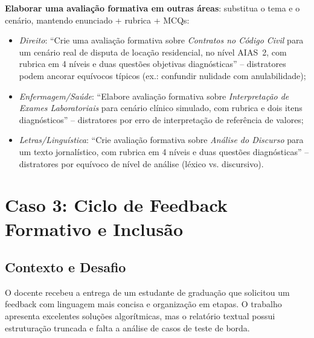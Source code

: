 \begin{adaptacaoarea}
\textbf{Elaborar uma avalia{\c c}{\~a}o formativa em outras {\'a}reas}: substitua o tema e o cen{\'a}rio, mantendo enunciado + rubrica + MCQs:
\begin{itemize}
  \item \emph{Direito}: ``Crie uma avalia{\c c}{\~a}o formativa sobre \emph{Contratos no C{\'o}digo Civil} para um cen{\'a}rio real de disputa de loca{\c c}{\~a}o residencial, no n{\'i}vel AIAS~2, com rubrica em 4 n{\'i}veis e duas quest{\~o}es objetivas diagn{\'o}sticas'' -- distratores podem ancorar equ{\'i}vocos t{\'i}picos (ex.: confundir nulidade com anulabilidade);
  \item \emph{Enfermagem/Sa{\'u}de}: ``Elabore avalia{\c c}{\~a}o formativa sobre \emph{Interpreta{\c c}{\~a}o de Exames Laboratoriais} para cen{\'a}rio cl{\'i}nico simulado, com rubrica e dois itens diagn{\'o}sticos'' -- distratores por erro de interpreta{\c c}{\~a}o de refer{\^e}ncia de valores;
  \item \emph{Letras/Lingu{\'i}stica}: ``Crie avalia{\c c}{\~a}o formativa sobre \emph{An{\'a}lise do Discurso} para um texto jornal{\'i}stico, com rubrica em 4 n{\'i}veis e duas quest{\~o}es diagn{\'o}sticas'' -- distratores por equ{\'i}voco de n{\'i}vel de an{\'a}lise (l{\'e}xico vs. discursivo).
\end{itemize}
\end{adaptacaoarea}

\section{Caso 3: Ciclo de Feedback Formativo e Inclus{\~a}o}

\subsection{Contexto e Desafio}
O docente recebeu a entrega de um estudante de gradua{\c c}{\~a}o que solicitou um feedback com linguagem mais concisa e organiza{\c c}{\~a}o em etapas. O trabalho apresenta excelentes solu{\c c}{\~o}es algor{\'i}tmicas, mas o relat{\'o}rio textual possui estrutura{\c c}{\~a}o truncada e falta a an{\'a}lise de casos de teste de borda.

